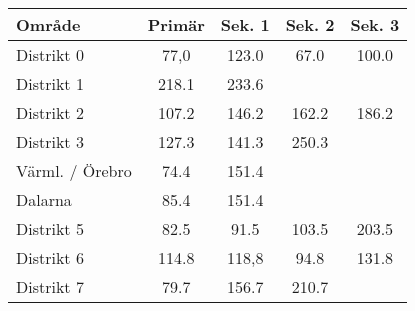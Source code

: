 \begin{tabular}{lcccc}
	\textbf{Område} & \textbf{Primär} & \textbf{Sek. 1} & \textbf{Sek. 2} & \textbf{Sek. 3} \\ \hline
	Distrikt 0      &      77,0       &      123.0      &      67.0       &      100.0      \\
	Distrikt 1      &      218.1      &      233.6      &                 &  \\
	Distrikt 2      &      107.2      &      146.2      &      162.2      &      186.2      \\
	Distrikt 3      &      127.3      &      141.3      &      250.3      &  \\
	Värml. / Örebro &      74.4       &      151.4      &                 &  \\
	Dalarna         &      85.4       &      151.4      &                 &  \\
	Distrikt 5      &      82.5       &      91.5       &      103.5      &      203.5      \\
	Distrikt 6      &      114.8      &      118,8      &      94.8       &      131.8      \\
	Distrikt 7      &      79.7       &      156.7      &      210.7      &
\end{tabular}
